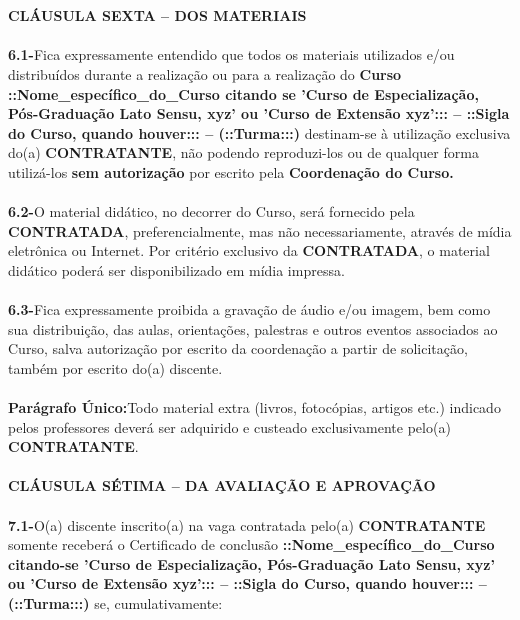 \documentclass[a4paper,7.5pt]{article}
\begin{document}
\\\\
{\bf CLÁUSULA SEXTA – DOS MATERIAIS}
\\\\
{\bf6.1-}\indent Fica expressamente entendido que todos os materiais utilizados e/ou distribuídos durante a realização ou para a realização do {\bf Curso ::Nome\_específico\_do\_Curso citando se 'Curso de Especialização, Pós-Graduação Lato Sensu, xyz' ou 'Curso de Extensão xyz'::: – ::Sigla do Curso, quando houver::: – (::Turma:::)} destinam-se à utilização exclusiva do(a) {\bf CONTRATANTE}, não podendo reproduzi-los ou de qualquer forma utilizá-los {\bf sem autorização} por escrito pela {\bf Coordenação do Curso.}
\\\\
{\bf6.2-}\indent O material didático, no decorrer do Curso, será fornecido pela {\bf CONTRATADA}, preferencialmente, mas não necessariamente, através de mídia eletrônica ou Internet. Por critério exclusivo da {\bf CONTRATADA}, o material didático poderá ser disponibilizado em mídia impressa.
\\\\
{\bf6.3-}\indent Fica expressamente proibida a gravação de áudio e/ou imagem, bem como sua distribuição, das aulas, orientações, palestras e outros eventos associados ao Curso, salva autorização por escrito da coordenação a partir de solicitação, também por escrito do(a) discente.
\\\\
{\bf Parágrafo Único:}\indent Todo material extra (livros, fotocópias, artigos etc.) indicado pelos professores deverá ser adquirido e custeado exclusivamente pelo(a) {\bf CONTRATANTE}.
\\\\
{\bf CLÁUSULA SÉTIMA – DA AVALIAÇÃO E APROVAÇÃO}
\\\\
{\bf7.1-}\indent O(a) discente inscrito(a) na vaga contratada pelo(a) {\bf CONTRATANTE} somente receberá o Certificado de conclusão {\bf ::Nome\_específico\_do\_Curso citando-se 'Curso de Especialização, Pós-Graduação Lato Sensu, xyz' ou 'Curso de Extensão xyz'::: – ::Sigla do Curso, quando houver::: – (::Turma:::)} se, cumulativamente:
\end{document}
